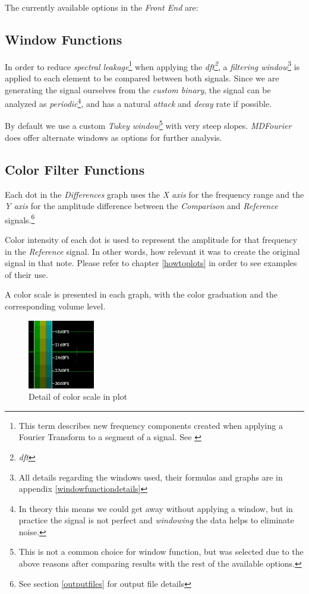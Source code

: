 \documentclass[10pt,a4paper]{report}
\newcommand{\define}[1]{
	\textit{\acrshort{#1}\footnote{\textit{\acrlong{#1}}}}}
\begin{document}
\begin{appendices}
The currently available options in the \textit{Front End} are:

\subsection{Window Functions}
\label{windows}

In order to reduce \textit{spectral leakage}\footnote{This term describes new frequency components created when applying a Fourier Transform to a segment of a signal. See \cite{leakage}} when applying the \define{dft}, a \textit{filtering window}\footnote{All details regarding the windows used, their formulas and graphs are in appendix \ref{windowfunctiondetails}} is applied to each element to be compared between both signals. Since we are generating the signal ourselves from the \textit{custom binary}, the signal can be analyzed as \textit{periodic}\footnote{In theory this means we could get away without applying a window, but in practice the signal is not perfect and \textit{windowing} the data helps to eliminate noise.}, and has a natural \textit{attack} and \textit{decay} rate if possible.

By default we use a custom \textit{Tukey window}\footnote{This is not a common choice for window function, but was selected due to the above reasons after comparing results with  the rest of the available options.} with very steep slopes. \textit{MDFourier} does offer alternate windows as options for further analysis.

\subsection{Color Filter Functions}
\label{colorfilter}

Each dot in the \textit{Differences} graph uses the \textit{X axis} for the frequency range and the \textit{Y axis} for the amplitude difference between the \textit{Comparison} and \textit{Reference} signals.\footnote{See section \ref{outputfiles} for output file details}

Color intensity of each dot is used to represent the amplitude for that frequency in the \textit{Reference} signal. In other words, how relevant it was to create the original signal in that note. Please refer to chapter \ref{howtoplots} in order to see examples of their use.

A color scale is presented in each graph, with the color graduation and the corresponding volume level.

\begin{figure}[H]
	\centering
	\includegraphics[width=0.2\linewidth]{images/colorfilter/colorscale.png}
	\caption[Plot color scale]{Detail of color scale in plot}
	\label{fig:colorscale}
\end{figure}


\end{appendices}
\end{document}
